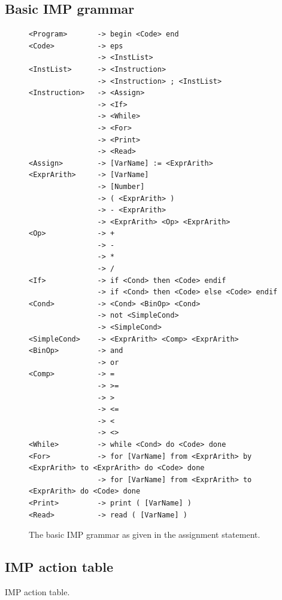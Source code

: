 \documentclass[a4paper,11pt]{article}
\begin{document}
  \subsection{Basic IMP grammar}
    \begin{figure}[h!]
      \centering
      \begin{lstlisting}
<Program>       -> begin <Code> end
<Code>          -> eps
                -> <InstList>
<InstList>      -> <Instruction>
                -> <Instruction> ; <InstList>
<Instruction>   -> <Assign>
                -> <If>
                -> <While>
                -> <For>
                -> <Print>
                -> <Read>
<Assign>        -> [VarName] := <ExprArith>
<ExprArith>     -> [VarName]
                -> [Number]
                -> ( <ExprArith> )
                -> - <ExprArith>
                -> <ExprArith> <Op> <ExprArith>
<Op>            -> +
                -> -
                -> *
                -> /
<If>            -> if <Cond> then <Code> endif
                -> if <Cond> then <Code> else <Code> endif
<Cond>          -> <Cond> <BinOp> <Cond>
                -> not <SimpleCond>
                -> <SimpleCond>
<SimpleCond>    -> <ExprArith> <Comp> <ExprArith>
<BinOp>         -> and
                -> or
<Comp>          -> = 
                -> >= 
                -> > 
                -> <= 
                -> < 
                -> <> 
<While>         -> while <Cond> do <Code> done
<For>           -> for [VarName] from <ExprArith> by <ExprArith> to <ExprArith> do <Code> done
                -> for [VarName] from <ExprArith> to <ExprArith> do <Code> done
<Print>         -> print ( [VarName] )
<Read>          -> read ( [VarName] )
      \end{lstlisting}
      \caption{The basic IMP grammar as given in the assignment statement.}
      \label{fig:basicimpgrammar}
    \end{figure}
    
  \subsection{IMP action table}
    \begin{table} %
      \centering
      
      \caption{IMP action table.}
      \label{impactiontable}
    \end{table}
\end{document}
